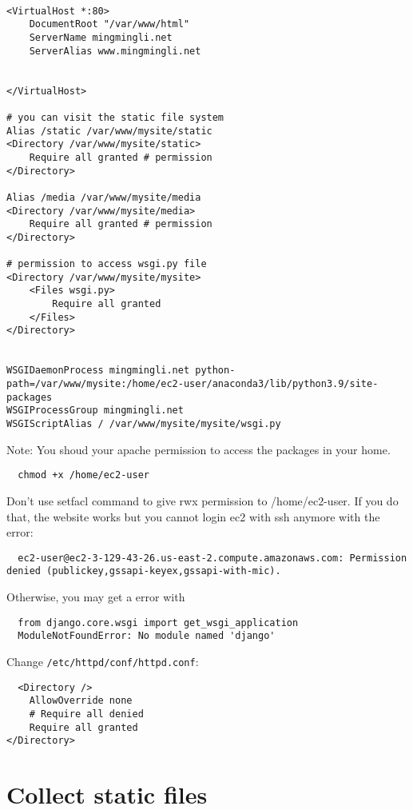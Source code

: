 \lstset{language=Python}
\begin{lstlisting}

<VirtualHost *:80>
    DocumentRoot "/var/www/html"
    ServerName mingmingli.net
    ServerAlias www.mingmingli.net


</VirtualHost>
    
# you can visit the static file system  
Alias /static /var/www/mysite/static 
<Directory /var/www/mysite/static>
    Require all granted # permission
</Directory>

Alias /media /var/www/mysite/media
<Directory /var/www/mysite/media>
    Require all granted # permission
</Directory>

# permission to access wsgi.py file
<Directory /var/www/mysite/mysite> 
    <Files wsgi.py>
        Require all granted
    </Files>
</Directory>


WSGIDaemonProcess mingmingli.net python-path=/var/www/mysite:/home/ec2-user/anaconda3/lib/python3.9/site-packages
WSGIProcessGroup mingmingli.net
WSGIScriptAlias / /var/www/mysite/mysite/wsgi.py
\end{lstlisting}

Note:
You shoud your apache permission to access the packages in your home.
\begin{lstlisting}
  chmod +x /home/ec2-user
\end{lstlisting}

Don't  use  setfacl command to give  rwx permission to /home/ec2-user.
If you do that, the website works  but you cannot  login  ec2  with ssh  anymore with the  error:
\begin{lstlisting}
  ec2-user@ec2-3-129-43-26.us-east-2.compute.amazonaws.com: Permission denied (publickey,gssapi-keyex,gssapi-with-mic).
\end{lstlisting}


Otherwise, you may get a error with
\begin{lstlisting}
  from django.core.wsgi import get_wsgi_application
  ModuleNotFoundError: No module named 'django'
\end{lstlisting}



Change \verb|/etc/httpd/conf/httpd.conf|:
\begin{lstlisting}
  <Directory />
    AllowOverride none
    # Require all denied
    Require all granted
</Directory>
\end{lstlisting}

\section{Collect static files}

